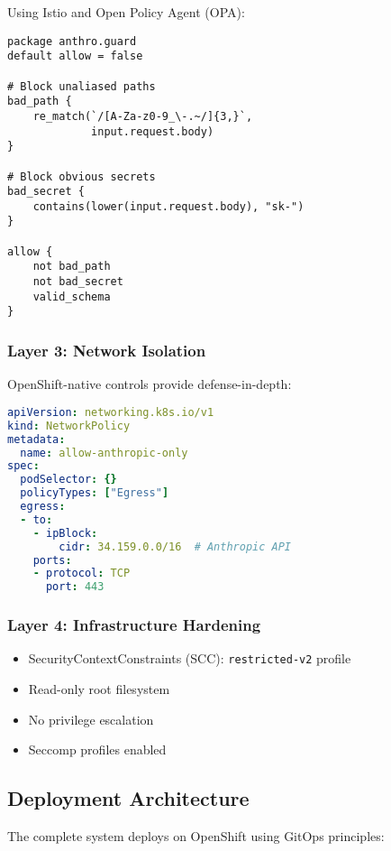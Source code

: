 \documentclass[11pt]{article}
\begin{document}
Using Istio and Open Policy Agent (OPA):

\begin{lstlisting}[language=rego, caption={OPA policy for data firewall}]
package anthro.guard
default allow = false

# Block unaliased paths
bad_path {
    re_match(`/[A-Za-z0-9_\-.~/]{3,}`, 
             input.request.body)
}

# Block obvious secrets
bad_secret {
    contains(lower(input.request.body), "sk-")
}

allow {
    not bad_path
    not bad_secret
    valid_schema
}
\end{lstlisting}

\subsubsection{Layer 3: Network Isolation}

OpenShift-native controls provide defense-in-depth:

\begin{lstlisting}[language=yaml, caption={NetworkPolicy for strict egress}]
apiVersion: networking.k8s.io/v1
kind: NetworkPolicy
metadata:
  name: allow-anthropic-only
spec:
  podSelector: {}
  policyTypes: ["Egress"]
  egress:
  - to:
    - ipBlock:
        cidr: 34.159.0.0/16  # Anthropic API
    ports:
    - protocol: TCP
      port: 443
\end{lstlisting}

\subsubsection{Layer 4: Infrastructure Hardening}

\begin{itemize}
\item SecurityContextConstraints (SCC): \texttt{restricted-v2} profile
\item Read-only root filesystem
\item No privilege escalation
\item Seccomp profiles enabled
\end{itemize}

\subsection{Deployment Architecture}

The complete system deploys on OpenShift using GitOps principles:
\end{document}
